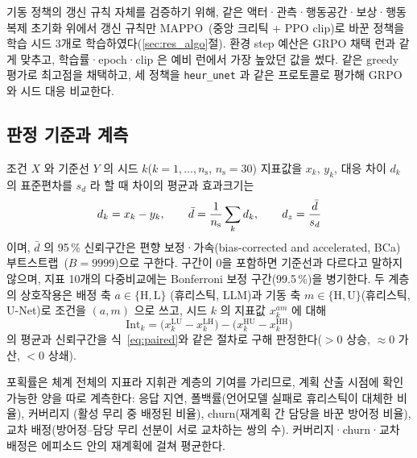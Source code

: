 기동 정책의 갱신 규칙 자체를 검증하기 위해, 같은 액터·관측·행동공간·보상·행동복제 초기화
위에서 갱신 규칙만 MAPPO~\citep{yu2022mappo}(중앙 크리틱 + PPO clip)로 바꾼 정책을 학습 시드
3개로 학습하였다(\ref{sec:res_algo}절). 환경 step 예산은 GRPO 채택 런과 같게 맞추고, 학습률·epoch·clip 은
예비 런에서 가장 높았던 값을 썼다. 같은 greedy 평가로 최고점을 채택하고, 세 정책을
\texttt{heur\_unet} 과 같은 프로토콜로 평가해 GRPO 와 시드 대응 비교한다.

\subsection{판정 기준과 계측}
\label{sec:stats}

조건 $X$ 와 기준선 $Y$ 의 시드 $k$($k = 1, \dots, n_{\mathrm{s}}$, $n_{\mathrm{s}} = 30$)
지표값을 $x_k$, $y_k$, 대응 차이 $d_k$ 의 표준편차를 $s_d$ 라 할 때 차이의 평균과 효과크기는
\begin{equation}
d_k = x_k - y_k, \qquad
\bar{d} = \frac{1}{n_{\mathrm{s}}}\sum_{k} d_k, \qquad
d_z = \frac{\bar{d}}{s_d}
\label{eq:paired}
\end{equation}
이며, $\bar{d}$ 의 95\,\% 신뢰구간은
편향 보정·가속(bias-corrected and accelerated, BCa) 부트스트랩~\citep{efron1993bootstrap,
diciccio1996bca}($B = 9999$)으로 구한다. 구간이
0을 포함하면 기준선과 다르다고 말하지 않으며, 지표 10개의 다중비교에는 Bonferroni 보정
구간(99.5\,\%)을 병기한다. 두 계층의 상호작용은 배정 축 $a \in \{\mathrm{H}, \mathrm{L}\}$
(휴리스틱, LLM)과 기동 축 $m \in \{\mathrm{H}, \mathrm{U}\}$(휴리스틱, U-Net)로 조건을
$(a, m)$ 으로 쓰고, 시드 $k$ 의 지표값 $x_k^{am}$ 에 대해
\begin{equation}
\mathrm{Int}_k = \big(x_k^{\mathrm{LU}} - x_k^{\mathrm{LH}}\big)
               - \big(x_k^{\mathrm{HU}} - x_k^{\mathrm{HH}}\big)
\label{eq:interaction}
\end{equation}
의 평균과 신뢰구간을 식~\eqref{eq:paired}와 같은 절차로 구해 판정한다($>0$ 상승,
$\approx 0$ 가산, $<0$ 상쇄).

포획률은 체계 전체의 지표라 지휘관 계층의 기여를 가리므로, 계획 산출 시점에 확인 가능한
양을 따로 계측한다: 응답 지연, 폴백률(언어모델 실패로 휴리스틱이 대체한 비율), 커버리지
(활성 무리 중 배정된 비율), churn(재계획 간 담당을 바꾼 방어정 비율), 교차 배정(방어정--담당
무리 선분이 서로 교차하는 쌍의 수). 커버리지·churn·교차 배정은 에피소드 안의 재계획에 걸쳐 평균한다.
